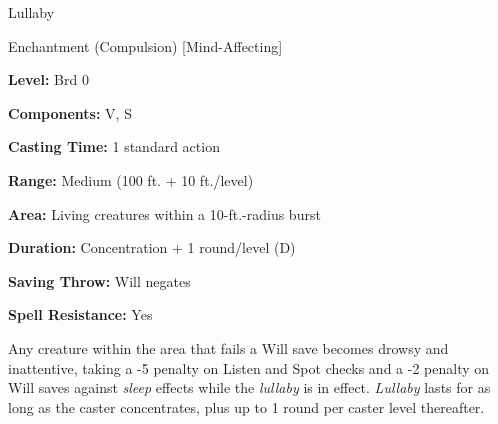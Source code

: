 \documentclass{article}
\begin{document}
\vspace{12pt}
Lullaby

Enchantment (Compulsion) [Mind-Affecting]

\textbf{Level:} Brd 0

\textbf{Components:} V, S

\textbf{Casting Time:} 1 standard action

\textbf{Range: }Medium (100 ft. + 10 ft./level)

\textbf{Area:} Living creatures within a 10-ft.-radius burst

\textbf{Duration:} Concentration + 1 round/level (D)

\textbf{Saving Throw: }Will negates

\textbf{Spell Resistance:} Yes

Any creature within the area that fails a Will save becomes drowsy and inattentive, 
taking a -5 penalty on Listen and Spot checks and a -2 penalty on Will saves against 
\textit{sleep }effects while the \textit{lullaby }is in effect. \textit{Lullaby 
}lasts for as long as the caster concentrates, plus up to 1 round per caster level 
thereafter.

\newpage
\end{document}
